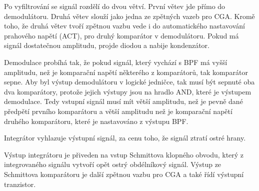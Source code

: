 Po vyfiltrování se signál rozdělí do dvou větví. První větev jde přímo do demodulátoru. Druhá větev slouží jako jedna ze zpětných vazeb pro CGA. Kromě toho, že druhá větev tvoří zpětnou vazbu vede i do automatického nastavování prahového napětí (ACT), pro druhý komparátor v demodulátoru. Pokud má signál dostatečnou amplitudu, projde diodou a nabije kondenzátor.

Demodulace probíhá tak, že pokud signál, který vychází s BPF má vyšší amplitudu, než je komparační napětí některého z komparátorů, tak komparátor sepne. Aby byl výstup demodulátoru v logické jedničce, tak musí být sepnuté oba dva komparátory, protože jejich výstupy jsou na hradlo AND, které je výstupem demodulace. Tedy vstupní signál musí mít větší amplitudu, než je pevně dané předpětí prvního komparátoru a větší amplitudu než je komparační napětí druhého komparátoru, které je nastavováno z výstupu BPF.

Integrátor vyhlazuje výstupní signál, za cenu toho, že signál ztratí ostré hrany.

Výstup integrátoru je přiveden na vstup Schmittova klopného obvodu, který z integrovaného signálu vytvoří opět ostrý obdélníkový signál. Výstup ze Schmittova komparátoru je další zpětnou vazbu pro CGA a také řídí výstupní tranzistor.
